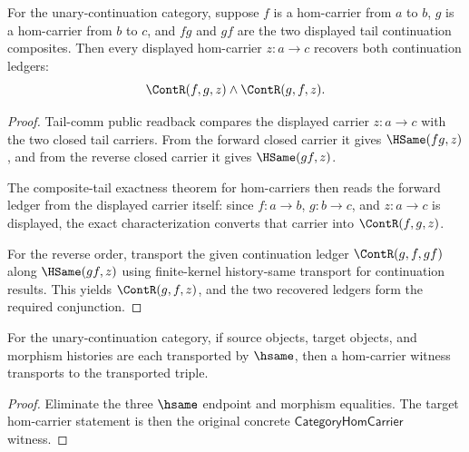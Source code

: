 \begin{theorem}
\label{thm:category-hom-carrier-tail-comm-cont-readback}
For the unary-continuation category, suppose $f$ is a hom-carrier from $a$ to
$b$, $g$ is a hom-carrier from $b$ to $c$, and $fg$ and $gf$ are the two
displayed tail continuation composites. Then every displayed hom-carrier
$z:a\to c$ recovers both continuation ledgers:
$$
\ContR(f,g,z)\wedge\ContR(g,f,z).
$$
\end{theorem}
\begin{proof}
Tail-comm public readback compares the displayed carrier $z:a\to c$ with the
two closed tail carriers. From the forward closed carrier it gives
$\HSame(fg,z)$, and from the reverse closed carrier it gives $\HSame(gf,z)$.

The composite-tail exactness theorem for hom-carriers then reads the forward
ledger from the displayed carrier itself: since $f:a\to b$, $g:b\to c$, and
$z:a\to c$ is displayed, the exact characterization converts that carrier
into $\ContR(f,g,z)$.

For the reverse order, transport the given continuation ledger
$\ContR(g,f,gf)$ along $\HSame(gf,z)$ using finite-kernel history-same
transport for continuation results. This yields $\ContR(g,f,z)$, and the two
recovered ledgers form the required conjunction.
\end{proof}

\begin{theorem}
\label{thm:category-hom-carrier-hsame-transport}
For the unary-continuation category, if source objects, target objects, and
morphism histories are each transported by $\hsame$, then a hom-carrier witness
transports to the transported triple.
\end{theorem}
\begin{proof}
Eliminate the three $\hsame$ endpoint and morphism equalities. The target
hom-carrier statement is then the original concrete
$\mathsf{CategoryHomCarrier}$ witness.
\end{proof}

